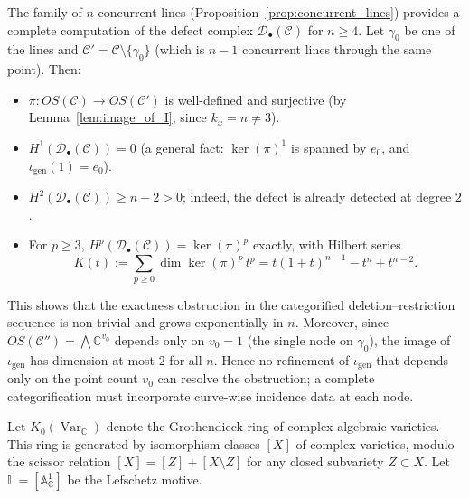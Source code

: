 \documentclass[article,11pt]{amsart} \numberwithin{equation}{section}
\numberwithin{equation}{section}
\begin{document}
{\begin{rk}
	\label{rmk:solvable_defect}
	The family of $n$ concurrent lines (Proposition~\ref{prop:concurrent_lines}) provides a complete computation of the defect complex $\mathcal D_\bullet(\mathcal C)$ for $n\ge4$. Let $\gamma_0$ be one of the lines and $\mathcal C'=\mathcal C\setminus\{\gamma_0\}$ (which is $n-1$ concurrent lines through the same point). Then:
	\begin{itemize}
		\item $\pi:OS(\mathcal C)\longrightarrow OS(\mathcal C')$ is well-defined and surjective (by Lemma~\ref{lem:image_of_I}, since $k_x=n\ne3$).
		\item $H^1(\mathcal D_\bullet(\mathcal C))=0$ (a general fact: $\ker(\pi)^1$ is spanned by $e_0$, and $\iota_{\mathrm{gen}}(1)=e_0$).
		\item $H^2(\mathcal D_\bullet(\mathcal C))\ge n-2>0$; indeed, the defect is already detected at degree $2$.
		\item For $p\ge3$, $H^p(\mathcal D_\bullet(\mathcal C))=\ker(\pi)^p$ exactly, with Hilbert series
		\[
		K(t):=\sum_{p\ge0}\dim\ker(\pi)^p\,t^p
		= t(1+t)^{n-1}-t^n+t^{n-2}.
		\]
	\end{itemize}
	This shows that the exactness obstruction in the categorified deletion--restriction sequence is non-trivial and grows exponentially in $n$. Moreover, since $OS(\mathcal C'')=\bigwedge\mathbb C^{v_0}$ depends only on $v_0=1$ (the single node on $\gamma_0$), the image of $\iota_{\mathrm{gen}}$ has dimension at most $2$ for all $n$. Hence no refinement of $\iota_{\mathrm{gen}}$ that depends only on the point count $v_0$ can resolve the obstruction; a complete categorification must incorporate curve-wise incidence data at each node.
\end{rk}

Let $K_0(\operatorname{Var}_{\mathbb{C}})$ denote the Grothendieck ring
of complex algebraic varieties. This ring is generated by isomorphism
classes $[X]$ of complex varieties, modulo the scissor relation
$[X] = [Z] + [X \setminus Z]$ for any closed subvariety $Z \subset X$.
Let $\mathbb{L} = [\mathbb{A}^1_{\mathbb{C}}]$ be the Lefschetz motive.

}
\end{document}
